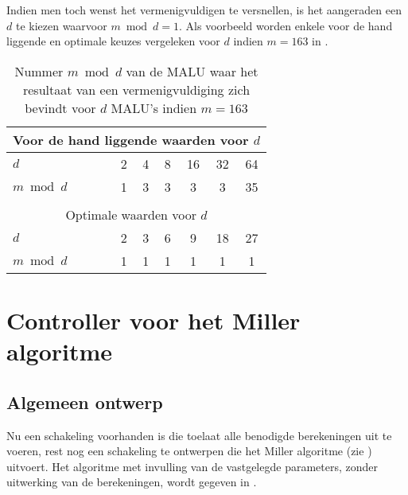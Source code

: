 Indien men toch wenst het vermenigvuldigen te versnellen, is het aangeraden een $d$ te kiezen waarvoor $m \bmod d = 1$. Als voorbeeld worden enkele voor de hand liggende en optimale keuzes vergeleken voor $d$ indien $m = 163$ in .

\begin{table}[h]
	\caption{Nummer $m \bmod d$ van de MALU waar het resultaat van een vermenigvuldiging zich bevindt voor $d$ MALU's indien \mbox{$m=163$}}
	\label{tabel-implementatie-woordbreedte-d}

	\centering
	\begin{tabular}{lcccccc}
		\toprule
		\multicolumn{7}{c}{Voor de hand liggende waarden voor $d$}\\
		\midrule
		$d$			& 2	& 4	& 8	& 16	& 32	& 64\\
		$m \bmod d \qquad$	& 1	& 3	& 3	& 3	& 3	& 35\\
		\bottomrule
		\multicolumn{7}{c}{}\\
		\toprule
		\multicolumn{7}{c}{Optimale waarden voor $d$}\\
		\midrule
		$d$			& 2	& 3	& 6	& 9	& 18	& 27\\
		$m \bmod d$	& 1	& 1	& 1	& 1	& 1	& 1\\
		\bottomrule
	\end{tabular}
\end{table}

\section{Controller voor het Miller algoritme\label{sectie-implementatie-miller}}

\subsection{Algemeen ontwerp\label{subsectie-implementatie-miller-ontwerp}}

Nu een schakeling voorhanden is die toelaat alle benodigde berekeningen uit te voeren, rest nog een schakeling te ontwerpen die het Miller algoritme (zie ) uitvoert. Het algoritme met invulling van de vastgelegde parameters, zonder uitwerking van de berekeningen, wordt gegeven in .

